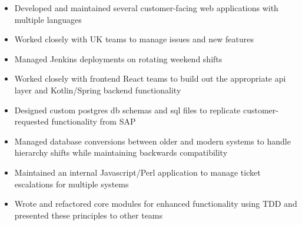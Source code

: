 \documentclass[10pt,a4paper,ragged2e]{altacv}
\begin{document}
\divider

\begin{itemize}
\item Developed and maintained several customer-facing web applications with multiple languages
\item Worked closely with UK teams to manage issues and new features
\item Managed Jenkins deployments on rotating weekend shifts
\end{itemize}

\divider

\begin{itemize}
\item Worked closely with frontend React teams to build out the appropriate api layer and Kotlin/Spring backend functionality
\item Designed custom postgres db schemas and sql files to replicate customer-requested functionality from SAP
\item Managed database conversions between older and modern systems to handle hierarchy shifts while maintaining backwards compatibility 
\end{itemize}

\divider

\begin{itemize}
\item Maintained an internal Javascript/Perl application to manage ticket escalations for multiple systems
\item Wrote and refactored core modules for enhanced functionality using TDD and presented these principles to other teams
\end{itemize}

\divider
\end{document}

